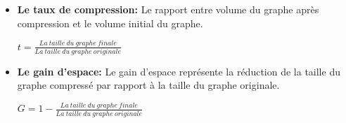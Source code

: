 				\begin{itemize}
					\item \textbf{Le taux de compression:} Le rapport entre volume du graphe après compression et le volume initial du graphe.
					\begin{center}
				$
				t = \frac{La\ taille\ du\ graphe\ finale}{La\ taille\ du\ graphe\ originale }
				$
				\end{center}
					\item \textbf{Le gain d'espace: }Le gain d'espace représente la réduction de la taille du graphe compressé par rapport à la taille du graphe originale.
					
					\begin{center}
				$
				G = 1 - \frac{La\ taille\ du\ graphe\ finale}{La\ taille\ du\ graphe\ originale }
				$
				\end{center}
					
					
				\end{itemize}
				
				
